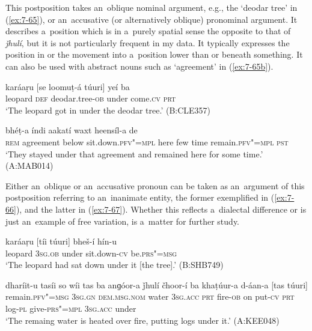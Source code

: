  This postposition takes an~oblique nominal argument, e.g., the `deodar tree' in (\ref{ex:7-65}), or an~accusative (or alternatively oblique) pronominal argument. It describes a~position which is in a~purely spatial sense the opposite to that of \textit{ǰhulí}, but it is not particularly frequent in my data. It typically expresses the position in or the movement into a~position lower than or beneath something. It can also be used with abstract nouns such as `agreement' in  (\ref{ex:7-65b}).

\begin{exe}
\ex
\label{ex:7-65}
\gll karáaṛu [se loomuṭ-á túuri] yeí ba \\
leopard \textsc{def} deodar.tree-\textsc{ob} under come.\textsc{cv} \textsc{prt} \\
\glt `The leopard got in under the deodar tree.' (B:CLE357)

\ex
\label{ex:7-65b}
 bhéṭ-a índi aakatí waxt heensíl-a de\\
\textsc{rem} agreement below sit.down.\textsc{pfv"=mpl} here few time remain.\textsc{pfv"=mpl} \textsc{pst}\\
\glt `They stayed under that agreement and remained here for some time.' (A:MAB014)
\end{exe}

Either an~oblique or an~accusative pronoun can be taken as an~argument of this postposition referring to an~inanimate entity, the former exemplified in (\ref{ex:7-66}), and the latter in (\ref{ex:7-67}). Whether this reflects a~dialectal difference or is just an~example of free variation, is a~matter for further study.

\begin{exe}
\ex
\label{ex:7-66}
\gll karáaṛu [tíi túuri] bheš-í hín-u \\
leopard \textsc{3sg.ob} under sit.down-\textsc{cv} be.\textsc{prs"=msg } \\
\glt `The leopard had sat down under it [the tree].' (B:SHB749)
\end{exe}
\begin{exe}
\ex
\label{ex:7-67}
\gll dharíit-u tasíi so wíi tas ba anɡóor-a ǰhulí čhoor-í ba
khaṭúur-a d-áan-a [tas túuri] \\
remain.\textsc{pfv"=msg} \textsc{3sg.gn} \textsc{dem.msg.nom} water \textsc{3sg.acc} \textsc{prt}  fire-\textsc{ob} on put-\textsc{cv} \textsc{prt} log-\textsc{pl} give-\textsc{prs"=mpl } \textsc{3sg.acc} under   \\
\glt `The remaing water is heated over fire, putting logs under it.' (A:KEE048)
\end{exe}

